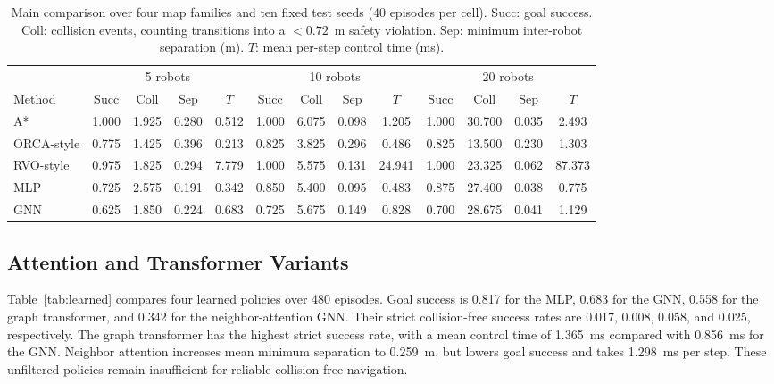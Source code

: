 \documentclass[conference]{IEEEtran}
\begin{document}
\begin{table}[t]
\caption{Main comparison over four map families and ten fixed test seeds
(40 episodes per cell). Succ: goal success. Coll: collision events, counting
transitions into a $<0.72$~m safety violation. Sep: minimum inter-robot
separation (m). $T$: mean per-step control time (ms).}
\label{tab:main}
\centering
\footnotesize
\setlength{\tabcolsep}{3pt}
\begin{tabular}{lcccccccccccc}
\toprule
& \multicolumn{4}{c}{5 robots} & \multicolumn{4}{c}{10 robots} & \multicolumn{4}{c}{20 robots}\\
\cmidrule(lr){2-5}\cmidrule(lr){6-9}\cmidrule(lr){10-13}
Method & Succ & Coll & Sep & $T$ & Succ & Coll & Sep & $T$ & Succ & Coll & Sep & $T$\\
\midrule
A*         & 1.000 & 1.925  & 0.280 & 0.512 & 1.000 & 6.075  & 0.098 & 1.205 & 1.000 & 30.700 & 0.035 & 2.493\\
ORCA-style & 0.775 & 1.425  & 0.396 & 0.213 & 0.825 & 3.825  & 0.296 & 0.486 & 0.825 & 13.500 & 0.230 & 1.303\\
RVO-style  & 0.975 & 1.825  & 0.294 & 7.779 & 1.000 & 5.575  & 0.131 & 24.941 & 1.000 & 23.325 & 0.062 & 87.373\\
MLP        & 0.725 & 2.575  & 0.191 & 0.342 & 0.850 & 5.400  & 0.095 & 0.483 & 0.875 & 27.400 & 0.038 & 0.775\\
GNN        & 0.625 & 1.850  & 0.224 & 0.683 & 0.725 & 5.675  & 0.149 & 0.828 & 0.700 & 28.675 & 0.041 & 1.129\\
\bottomrule
\end{tabular}
\end{table}

\subsection{Attention and Transformer Variants}
Table~\ref{tab:learned} compares four learned policies over 480 episodes.
Goal success is 0.817 for the MLP, 0.683 for the GNN, 0.558 for the graph
transformer, and 0.342 for the neighbor-attention GNN. Their strict
collision-free success rates are 0.017, 0.008, 0.058, and 0.025,
respectively. The graph transformer has the highest strict success rate,
with a mean control time of 1.365~ms compared with 0.856~ms for the GNN.
Neighbor attention increases mean minimum separation to 0.259~m, but lowers
goal success and takes 1.298~ms per step. These unfiltered policies remain
insufficient for reliable collision-free navigation.
\end{document}
